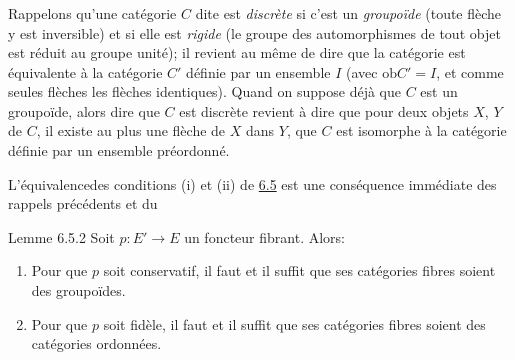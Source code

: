 \setcounter{subsection}{5} \setcounter{subsubsection}{0}
\subsubsection{}
Rappelons qu'une catégorie $C$ dite est \emph{discrète} si c'est un
\emph{groupoïde} (\ie toute flèche y est inversible) et si elle
est \emph{rigide} (\ie le groupe des automorphismes de tout objet
est réduit au groupe unité); il revient au même de dire que la
catégorie est équivalente à la catégorie $C'$ définie par un
ensemble $I$ (avec $\text{ob}C'=I$, et comme seules flèches les
flèches identiques). Quand on suppose déjà que $C$ est un
groupoïde, alors dire que $C$ est discrète revient à dire que pour
deux objets $X$, $Y$ de $C$, il existe au plus une flèche de $X$
dans $Y$, \ie que $C$ est isomorphe à la catégorie définie par un
ensemble préordonné.

L'équivalence\pageoriginale des conditions (i) et (ii) de
\hyperref[I.prop6.5]{6.5} est une conséquence immédiate des rappels précédents
et du

\begin{enonce*}{Lemme 6.5.2}
Soit $p:E'\rightarrow E$ un foncteur fibrant. Alors:
\begin{enumerate}
\renewcommand{\theenumi}{\roman{enumi}}
\renewcommand{\labelenumi}{(\theenumi)}
\item Pour que $p$ soit conservatif, il faut et il suffit que ses
  catégories fibres soient des groupoïdes.

\item Pour que $p$ soit fidèle, il faut et il suffit que ses
  catégories fibres soient des catégories ordonnées.
\end{enumerate}
\end{enonce*}

